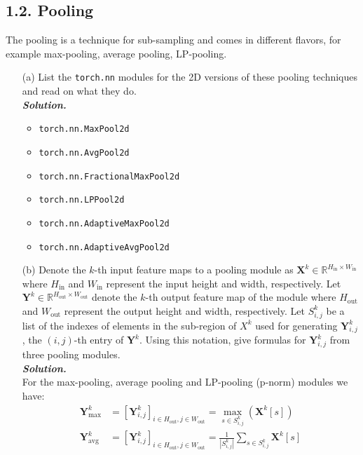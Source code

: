 \documentclass{article}
\newcommand{\matr}[1]{\bm{#1}}     %
\begin{document}
\newpage
\subsection*{1.2. Pooling}
The pooling is a technique for sub-sampling and comes in different flavors, for example max-pooling, average pooling, LP-pooling. 
\begin{itemize}
    \item[(a)] List the \texttt{torch.nn} modules for the 2D versions of these pooling techniques and read on what they do. \\
    \textbf{\textit{Solution.}}
        \begin{itemize}
            \item \texttt{torch.nn.MaxPool2d}
            \item \texttt{torch.nn.AvgPool2d}
            \item \texttt{torch.nn.FractionalMaxPool2d}
            \item \texttt{torch.nn.LPPool2d}
            \item \texttt{torch.nn.AdaptiveMaxPool2d}
            \item \texttt{torch.nn.AdaptiveAvgPool2d}
        \end{itemize}
    \item[(b)] Denote the $k$-th input feature maps to a pooling module as $\matr{X}^k \in \mathbb{R}^{H_{\textrm{in}}\times W_{\textrm{in}}} $ where $H_{\textrm{in}}$ and $W_{\text{in}}$ represent the input height and width, respectively. Let $\matr{Y}^k \in \mathbb{R}^{H_{\text{out}}\times W_{\textrm{out}}}$ denote the $k$-th output feature map of the module where $H_{\textrm{out}}$ and $W_{\textrm{out}}$ represent the output height and width, respectively. Let $S^{k}_{i,j}$ be a list of the indexes of elements in the sub-region of $X^k $ used for generating $\matr{Y}^k_{i,j}$, the $(i,j)$-th entry of $\matr{Y}^{k}$. 
    Using this notation, give formulas for $\matr{Y}^k_{i,j} $ from three pooling modules. \\
    \textbf{\textit{Solution.}} \\
    For the max-pooling, average pooling and LP-pooling (p-norm) modules we have:
    \begin{align*}
        \matr{Y}_{\max}^k &= \left[\matr{Y}^k_{i,j}\right]_{i \in H_{\text{out}}, j \in W_{\text{out}}} = \max_{s \in S^{k}_{i,j}}(\matr{X}^k[s]) \\
        \matr{Y}_{\text{avg}}^k &= \left[\matr{Y}^k_{i,j}\right]_{i \in H_{\text{out}}, j \in W_{\text{out}}} = \frac{1}{|S^{k}_{i,j}|}\sum_{s \in S^{k}_{i,j}} \matr{X}^k[s] \\

\end{align*}
\end{itemize}
\end{document}
